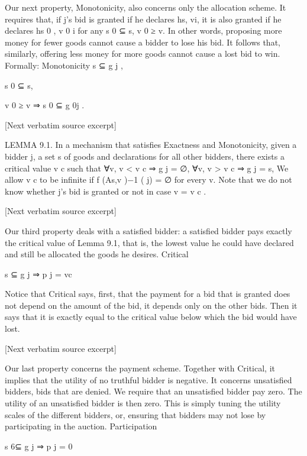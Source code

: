 \documentclass[10pt]{article}
\begin{document}
\begin{ReviewVerbatim}

Our next property, Monotonicity, also concerns only the allocation scheme. It
requires that, if j’s bid is granted if he declares hs, vi, it is also granted if he
declares hs 0 , v 0 i for any s 0 ⊆ s, v 0 ≥ v. In other words, proposing more money for
fewer goods cannot cause a bidder to lose his bid. It follows that, similarly, offering
less money for more goods cannot cause a lost bid to win. Formally:
Monotonicity s ⊆ g j ,

s 0 ⊆ s,

v 0 ≥ v ⇒ s 0 ⊆ g 0j .

[Next verbatim source excerpt]

LEMMA 9.1. In a mechanism that satisfies Exactness and Monotonicity, given
a bidder j, a set s of goods and declarations for all other bidders, there exists a
critical value v c such that
∀v, v < v c ⇒ g j = ∅,
∀v, v > v c ⇒ g j = s,
We allow v c to be infinite if f (As,v )−1 ( j) = ∅ for every v. Note that we do not
know whether j’s bid is granted or not in case v = v c .

[Next verbatim source excerpt]

Our third property deals with a satisfied bidder: a satisfied bidder pays exactly
the critical value of Lemma 9.1, that is, the lowest value he could have declared
and still be allocated the goods he desires.
Critical

s ⊆ g j ⇒ p j = vc

Notice that Critical says, first, that the payment for a bid that is granted does not
depend on the amount of the bid, it depends only on the other bids. Then it says
that it is exactly equal to the critical value below which the bid would have lost.

[Next verbatim source excerpt]

Our last property concerns the payment scheme. Together with Critical, it implies
that the utility of no truthful bidder is negative. It concerns unsatisfied bidders, bids
that are denied. We require that an unsatisfied bidder pay zero. The utility of an
unsatisfied bidder is then zero. This is simply tuning the utility scales of the different
bidders, or, ensuring that bidders may not lose by participating in the auction.
Participation

s 6⊆ g j ⇒ p j = 0
\end{ReviewVerbatim}
\end{document}
